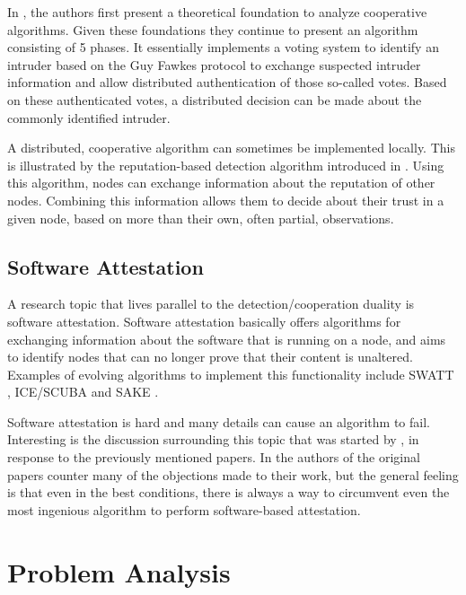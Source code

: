 \documentclass[conference]{IEEEtran}
\begin{document}
In \cite{krontiris2009cooperative}, the authors first present a theoretical
foundation to analyze cooperative algorithms. Given these foundations they
continue to present an algorithm consisting of 5 phases. It essentially
implements a voting system to identify an intruder based on the Guy Fawkes
protocol \cite{anderson1998new} to exchange suspected intruder information and
allow distributed authentication of those so-called votes. Based on these
authenticated votes, a distributed decision can be made about the commonly
identified intruder.

A distributed, cooperative algorithm can sometimes be implemented locally. This
is illustrated by the reputation-based detection algorithm introduced in
\cite{ganeriwal2008reputation}. Using this algorithm, nodes can exchange
information about the reputation of other nodes. Combining this information
allows them to decide about their trust in a given node, based on more than
their own, often partial, observations.

\subsection{Software Attestation}
\label{subsection:attestation}

A research topic that lives parallel to the detection/cooperation duality is
software attestation. Software attestation basically offers algorithms for
exchanging information about the software that is running on a node, and aims
to identify nodes that can no longer prove that their content is unaltered.
Examples of evolving algorithms to implement this functionality include SWATT
\cite{seshadri2004swatt}, ICE/SCUBA \cite{seshadri2006scuba} and SAKE
\cite{seshadri2008sake}.

Software attestation is hard and many details can cause an algorithm to fail.
Interesting is the discussion surrounding this topic that was started by
\cite{castelluccia2009difficulty}, in response to the previously mentioned
papers. In \cite{perrig2010refutation} the authors of the original papers
counter many of the objections made to their work, but the general feeling is
that even in the best conditions, there is always a way to circumvent even the
most ingenious algorithm to perform software-based attestation.

\section{Problem Analysis}
\label{section:problem}
\end{document}
